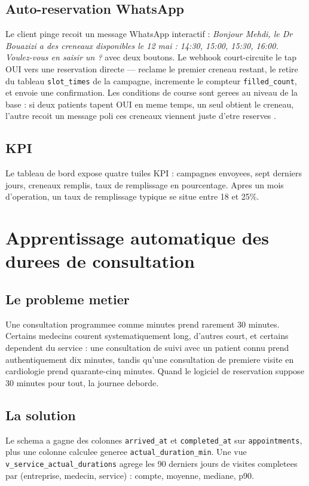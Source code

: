 \subsection{Auto-reservation WhatsApp}
Le client pinge recoit un message WhatsApp interactif :
\emph{\og Bonjour Mehdi, le Dr Bouazizi a des creneaux disponibles
le 12 mai : 14:30, 15:00, 15:30, 16:00. Voulez-vous en saisir un ? \fg{}}
avec deux boutons. Le webhook court-circuite le tap OUI vers une
reservation directe --- reclame le premier creneau restant, le retire
du tableau \texttt{slot\_times} de la campagne, incremente le compteur
\texttt{filled\_count}, et envoie une confirmation. Les conditions de
course sont gerees au niveau de la base : si deux patients tapent OUI
en meme temps, un seul obtient le creneau, l'autre recoit un message
poli \og ces creneaux viennent juste d'etre reserves \fg{}.

\subsection{KPI}
Le tableau de bord expose quatre tuiles KPI : campagnes envoyees, sept
derniers jours, creneaux remplis, taux de remplissage en pourcentage.
Apres un mois d'operation, un taux de remplissage typique se situe
entre 18 et 25\%.

\section{Apprentissage automatique des durees de consultation}

\subsection{Le probleme metier}
Une consultation programmee comme  minutes \fg{} prend rarement
30 minutes. Certains medecins courent systematiquement long, d'autres
court, et certains dependent du service : une consultation de suivi
avec un patient connu prend authentiquement dix minutes, tandis qu'une
consultation de premiere visite en cardiologie prend quarante-cinq
minutes. Quand le logiciel de reservation suppose 30 minutes pour
tout, la journee deborde.

\subsection{La solution}
Le schema a gagne des colonnes \texttt{arrived\_at} et
\texttt{completed\_at} sur \texttt{appointments}, plus une colonne
calculee generee \texttt{actual\_duration\_min}. Une vue
\texttt{v\_service\_actual\_durations} agrege les 90 derniers jours de
visites completees par (entreprise, medecin, service) : compte,
moyenne, mediane, p90.

